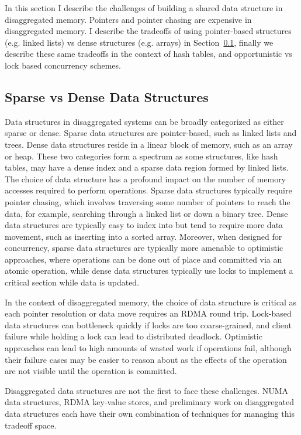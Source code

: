 \documentclass[12pt]{ucsddissertation}
\begin{document}
In this section I describe the challenges of building a shared data structure in disaggregated
memory. Pointers and pointer chasing are expensive in disaggregated memory. I describe the tradeoffs
of using pointer-based structures (e.g. linked lists) vs dense structures (e.g. arrays) in
Section~\ref{sec:sparse-dense}, finally we describe these same tradeoffs in the context of hash
tables, and opportunistic vs lock based concurrency schemes.


\subsection{Sparse vs Dense Data Structures}
\label{sec:sparse-dense}


Data structures in disaggregated systems can be broadly categorized as either sparse or dense.
Sparse data structures are pointer-based, such as linked lists and trees. Dense data structures
reside in a linear block of memory, such as an array or heap. These two categories form a spectrum
as some structures, like hash tables, may have a dense index and a sparse data region formed by
linked lists. The choice of data structure has a profound impact on the number of memory accesses
required to perform operations. Sparse data structures typically require pointer chasing, which
involves traversing some number of pointers to reach the data, for example, searching through a
linked list or down a binary tree. Dense data structures are typically easy to index into but tend
to require more data movement, such as inserting into a sorted array. Moreover, when designed for
concurrency, sparse data structures are typically more amenable to optimistic approaches, where
operations can be done out of place and committed via an atomic operation, while dense data
structures typically use locks to implement a critical section while data is updated.

In the context of disaggregated memory, the choice of data structure is critical as each pointer
resolution or data move requires an RDMA round trip. Lock-based data structures can bottleneck
quickly if locks are too coarse-grained, and client failure while holding a lock can lead to
distributed deadlock. Optimistic approaches can lead to high amounts of wasted work if operations
fail, although their failure cases may be easier to reason about as the effects of the operation are
not visible until the operation is committed.

Disaggregated data structures are not the first to face these challenges. NUMA data structures, RDMA
key-value stores, and preliminary work on disaggregated data structures each have their own
combination of techniques for managing this tradeoff space.
\end{document}

